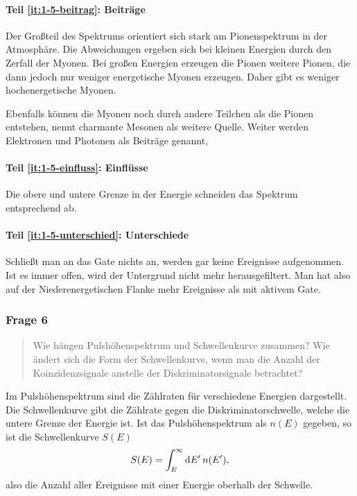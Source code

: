 \documentclass[11pt, ngerman, fleqn, DIV=15, headinclude, BCOR=2cm]{scrreprt}
\begin{document}
\paragraph{Teil \ref{it:1-5-beitrag}: Beiträge}

Der Großteil des Spektrums orientiert sich stark am Pionenspektrum in der
Atmosphäre. Die Abweichungen ergeben sich bei kleinen Energien durch den
Zerfall der Myonen. Bei großen Energien erzeugen die Pionen weitere Pionen, die
dann jedoch nur weniger energetische Myonen erzeugen. Daher gibt es weniger
hochenergetische Myonen. \parencite[§7.2]{Grupen/Astroteilchenphysik}

Ebenfalls können die Myonen noch durch andere Teilchen als die Pionen
entstehen, \parencite[115]{Grupen/Astroteilchenphysik} nennt charmante Mesonen
als weitere Quelle. Weiter werden Elektronen und Photonen als Beiträge genannt,

\paragraph{Teil \ref{it:1-5-einfluss}: Einflüsse}

Die obere und untere Grenze in der Energie schneiden das Spektrum entsprechend
ab.


\paragraph{Teil \ref{it:1-5-unterschied}: Unterschiede}

Schließt man an das Gate nichts an, werden gar keine Ereignisse aufgenommen.
Ist es immer offen, wird der Untergrund nicht mehr herausgefiltert. Man hat
also auf der Niederenergetischen Flanke mehr Ereignisse als mit aktivem Gate.

\subsubsection{Frage 6}

\begin{quote}
    Wie hängen Pulshöhenspektrum und Schwellenkurve zusammen? Wie ändert sich
    die Form der Schwellenkurve, wenn man die Anzahl der Koinzidenzsignale
    anstelle der Diskriminatorsignale betrachtet?
\end{quote}

Im Pulshöhenspektrum sind die Zählraten für verschiedene Energien dargestellt.
Die Schwellenkurve gibt die Zählrate gegen die Diskriminatorschwelle, welche
die untere Grenze der Energie ist. Ist das Pulshöhenspektrum als $n(E)$
gegeben, so ist die Schwellenkurve $S(E)$
\[
    S(E) = \int_E^\infty \dif E' \, n(E'),
\]
also die Anzahl aller Ereignisse mit einer Energie oberhalb der Schwelle.
\end{document}
